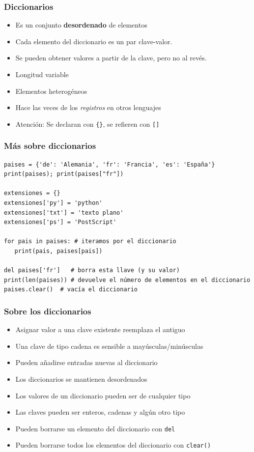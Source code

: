 \documentclass{beamer}
\begin{document}
\begin{frame}[fragile]
\frametitle{Diccionarios}  

\begin{itemize}
\item Es un conjunto {\bf desordenado} de elementos 
\item Cada elemento del diccionario es un par clave-valor. 
\item Se pueden obtener valores a partir de la clave, pero no al revés.
\item Longitud variable
\item Elementos heterogéneos
\item Hace las veces de los \emph{registros} en otros lenguajes
\item Atención: Se declaran con \verb|{}|, se refieren con \verb|[]|
\end{itemize}
\end{frame}


\begin{frame}[fragile]
\frametitle{Más sobre diccionarios}
  \begin{footnotesize}
\begin{verbatim}
paises = {'de': 'Alemania', 'fr': 'Francia', 'es': 'España'}
print(paises); print(paises["fr"])

extensiones = {}
extensiones['py'] = 'python'
extensiones['txt'] = 'texto plano'
extensiones['ps'] = 'PostScript'

for pais in paises: # iteramos por el diccionario
   print(pais, paises[pais])

del paises['fr']   # borra esta llave (y su valor)
print(len(paises)) # devuelve el número de elementos en el diccionario
paises.clear()  # vacía el diccionario

\end{verbatim}
  \end{footnotesize}

\end{frame}


\begin{frame}[fragile]
\frametitle{Sobre los diccionarios}  

  \begin{itemize}
  \item Asignar valor a una clave existente reemplaza el antiguo 
  \item Una clave de tipo cadena es sensible a mayúsculas/minúsculas
  \item Pueden añadirse entradas nuevas al diccionario
  \item Los diccionarios se mantienen desordenados
\item Los valores de un diccionario pueden ser de cualquier tipo
\item Las claves pueden ser enteros, cadenas y algún otro tipo
\item Pueden borrarse un elemento del diccionario con \verb|del|
\item Pueden borrarse todos los elementos del diccionario con \verb|clear()|
\end{itemize}

\end{frame}
\end{document}
